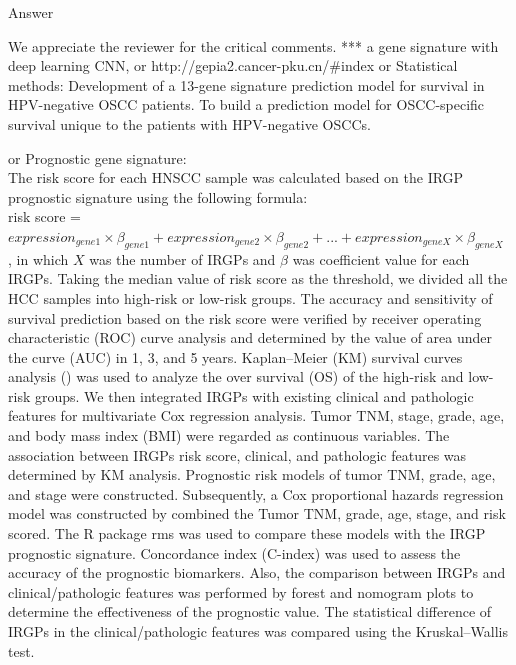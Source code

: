 \documentclass[preprint,12pt]{elsarticle}
\newenvironment{MyColorPar}[1]{%
    \leavevmode\color{#1}\ignorespaces%
}{%
}%
\begin{document}
%
\begin{MyColorPar}{blue}
Answer

We appreciate the reviewer for the critical comments.
***  a gene signature with deep learning CNN,
or http://gepia2.cancer-pku.cn/#index
or 
Statistical methods: Development of a 13-gene signature prediction model for survival in HPV-negative OSCC patients.
To build a prediction model for OSCC-specific survival unique to the patients with HPV-negative OSCCs\cite{Lohavanichbutr2013}.

or \cite{Zhao2018}
Prognostic gene signature:\\ %

The risk score for each HNSCC sample was calculated based on the IRGP prognostic signature using the following formula:\\[0.5cm]
risk score = $expression_{gene1} \times \beta_{gene1} + expression_{gene2} \times \beta_{gene2} + ... + expression_{geneX} \times \beta_{geneX}$\\

, in which $X$ was the number of IRGPs and $\beta$ was coefficient value for each IRGPs. Taking the median value of risk score as the threshold, we divided all the HCC samples into high-risk or low-risk groups. The accuracy and sensitivity of survival prediction based on the risk score were verified by receiver operating characteristic (ROC) curve analysis and determined by the value of area under the curve (AUC) in 1, 3, and 5 years. Kaplan–Meier (KM) survival curves analysis () was used to analyze the over survival (OS) of the high-risk and low-risk groups. We then integrated IRGPs with existing clinical and pathologic features for multivariate Cox regression analysis. Tumor TNM, stage, grade, age, and body mass index (BMI) were regarded as continuous variables. The association between IRGPs risk score, clinical, and pathologic features was determined by KM analysis. Prognostic risk models of tumor TNM, grade, age, and stage were constructed. Subsequently, a Cox proportional hazards regression model was constructed by combined the Tumor TNM, grade, age, stage, and risk scored. The R package rms was used to compare these models with the IRGP prognostic signature. Concordance index (C-index) was used to assess the accuracy of the prognostic biomarkers. Also, the comparison between IRGPs and clinical/pathologic features was performed by forest and nomogram plots to determine the effectiveness of the prognostic value. The statistical difference of IRGPs in the clinical/pathologic features was compared using the Kruskal–Wallis test.


\end{MyColorPar}
\end{document}
